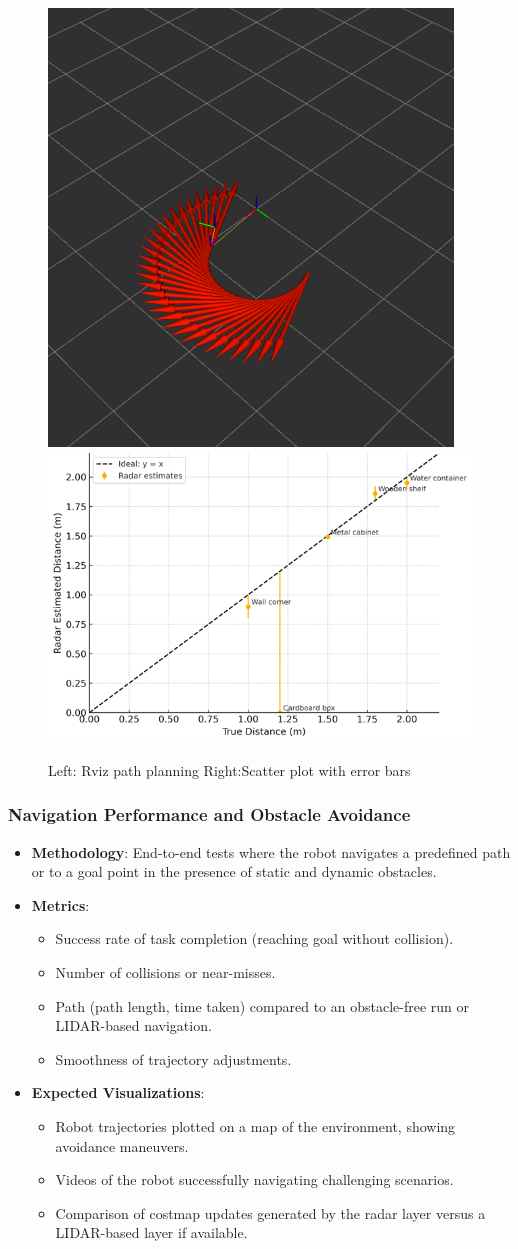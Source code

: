 \begin{figure}[H]
    \centering

     \includegraphics[width=0.3\linewidth]{Untitled.png}
    \includegraphics[width=0.48\linewidth]{Src//images/scatterplot.png}
    \caption{ Left: Rviz path planning Right:Scatter plot with error bars}
    \label{fig:Scatter}
\end{figure}

\subsubsection{Navigation Performance and Obstacle Avoidance}
\begin{itemize}
    \item \textbf{Methodology}: End-to-end tests where the robot navigates a predefined path or to a goal point in the presence of static and dynamic obstacles.
    \item \textbf{Metrics}:
    \begin{itemize}
        \item Success rate of task completion (reaching goal without collision).
        \item Number of collisions or near-misses.
        \item Path (path length, time taken) compared to an obstacle-free run or LIDAR-based navigation.
        \item Smoothness of trajectory adjustments.
    \end{itemize}
    \item \textbf{Expected Visualizations}:
    \begin{itemize}
        \item Robot trajectories plotted on a map of the environment, showing avoidance maneuvers.
        \item Videos of the robot successfully navigating challenging scenarios.
        \item Comparison of costmap updates generated by the radar layer versus a LIDAR-based layer if available.
    \end{itemize}
\end{itemize}

